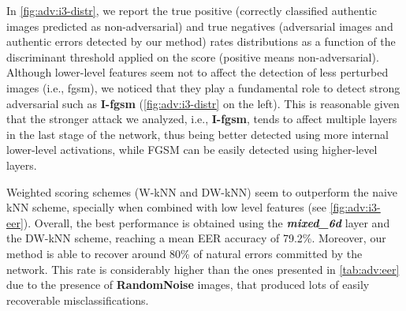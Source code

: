 In \ref{fig:adv:i3-distr}, we report the true positive (correctly classified authentic images predicted as non-adversarial) and true negatives (adversarial images and authentic errors detected by our method) rates distributions as a function of the discriminant threshold applied on the score (positive means non-adversarial).
Although lower-level features seem not to affect the detection of less perturbed images (i.e., \gls{fgsm}), we noticed that they play a fundamental role to detect strong adversarial such as \textbf{I-\gls{fgsm}} (\ref{fig:adv:i3-distr} on the left).
This is reasonable given that the stronger attack we analyzed, i.e., \textbf{I-\gls{fgsm}}, tends to affect multiple layers in the last stage of the network, thus being better detected using more internal lower-level activations, while FGSM can be easily detected using higher-level layers.

Weighted scoring schemes (W-kNN and DW-kNN) seem to outperform the naive kNN scheme, specially when combined with low level features (see \ref{fig:adv:i3-eer}).
Overall, the best performance is obtained using the \textbf{\emph{mixed\_6d}} layer and the DW-kNN scheme, reaching a mean EER accuracy of 79.2\%.
Moreover, our method is able to recover around 80\% of natural errors committed by the network. This rate is considerably higher than the ones presented in \ref{tab:adv:eer} due to the presence of \textbf{RandomNoise} images, that produced lots of easily recoverable misclassifications.


